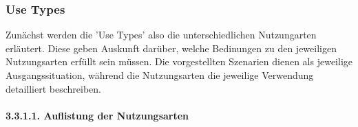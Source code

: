 \subsubsection{Use Types}

Zunächst werden die 'Use Types' also die unterschiedlichen Nutzungarten erläutert. Diese geben Auskunft darüber, welche Bedinungen zu den jeweiligen Nutzungsarten erfüllt sein müssen. Die vorgestellten Szenarien dienen als jeweilige Ausgangssituation, während die Nutzungsarten die jeweilige Verwendung detailliert beschreiben. 

\paragraph{3.3.1.1. Auflistung der Nutzungsarten}

\newcommand\A{\rule{0pt}{7ex}}
\newcommand\C{\rule[-6ex]{0pt}{0pt}}
\newcommand\D{\rule{0pt}{5ex}}
\newcommand\E{\rule[-4ex]{0pt}{0pt}}
\newcommand\F{\rule{0pt}{9ex}}
\newcommand\G{\rule[-8ex]{0pt}{0pt}}

